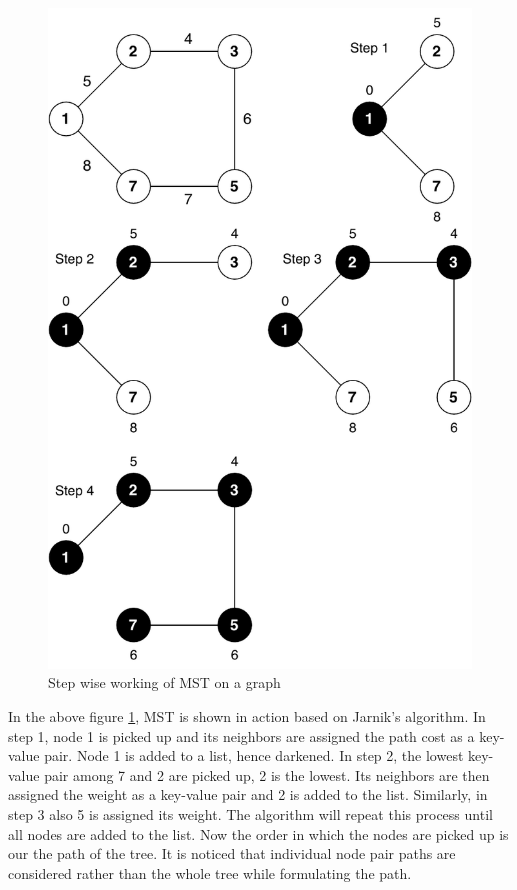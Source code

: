 \documentclass[journal,twoside,web]{ieeecolor}
\begin{document}
\begin{figure}[!h]
    \centerline{\includegraphics[scale=0.55]{figures/mst.pdf}}
    \caption{Step wise working of MST on a graph}
    \label{fig3}
\end{figure}

In the above figure \ref{fig3}, MST is shown in action based on Jarnik's algorithm. In step 1, node 1 is picked up and its neighbors are assigned the path cost as a key-value pair. Node 1 is added to a list, hence darkened. In step 2, the lowest key-value pair among 7 and 2 are picked up, 2 is the lowest. Its neighbors are then assigned the weight as a key-value pair and 2 is added to the list. Similarly, in step 3 also 5 is assigned its weight. The algorithm will repeat this process until all nodes are added to the list. Now the order in which the nodes are picked up is our the path of the tree. It is noticed that individual node pair paths are considered rather than the whole tree while formulating the path.
\end{document}
